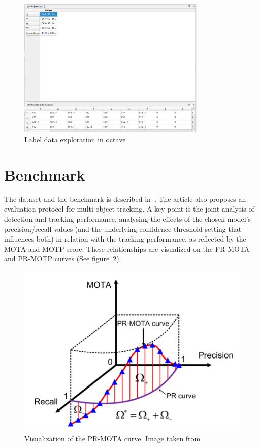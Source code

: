 \begin{figure}[h]
    \begin{center}
        \captionsetup{width=0.8\textwidth}
        \includegraphics[width=0.8\textwidth]{figures/octave.png}
        \caption{Label data exploration in octave}
        \label{fig:octave-exploration}
    \end{center}
\end{figure}


\section{Benchmark}

The dataset and the benchmark is described in~\cite{CVIU_UA-DETRAC}. The article also proposes an evaluation protocol for multi-object tracking. A key point is the joint analysis of detection and tracking performance, analysing the effects of the chosen model's precision/recall values (and the underlying confidence threshold setting that influences both) in relation with the tracking performance, as reflected by the MOTA and MOTP score. These relationships are visualized on the PR-MOTA and PR-MOTP curves (See figure~\ref{fig:pr-mota}).

\begin{figure}[h]
    \captionsetup{width=\textwidth}
    \includegraphics[width=\textwidth]{figures/pr-mota-curve.png}
    \caption{Visualization of the PR-MOTA curve. Image taken from \cite{CVIU_UA-DETRAC}}
    \label{fig:pr-mota}
\end{figure}

